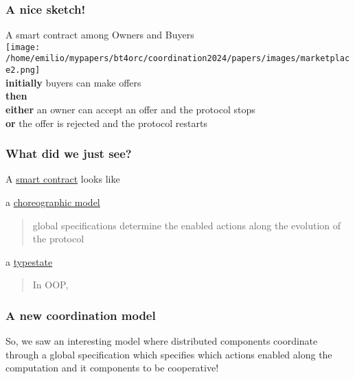 \begin{frame}
  \frametitle{A nice sketch! \cite{azure,azure/smp}}
  
  A smart contract among Owners and Buyers
  \\[1em]
  \texttt{[image: /home/emilio/mypapers/bt4orc/coordination2024/papers/images/marketplace2.png]}
  \\[1em]
  \textbf{initially} buyers can make offers
  \\\textbf{then}
  \\\phantom{xxx} \textbf{either} an owner can accept an offer and the protocol stops
  \\\phantom{xxx}	\textbf{or} the offer is rejected and the protocol restarts
\end{frame}

\begin{frame}
  \frametitle{What did we just see?}
  A \underline{smart contract} looks like

  \itemit a \underline{choreographic model}
  \begin{quote}
	 global specifications determine the
	 enabled actions along the evolution of the protocol
  \end{quote}
  \itemit a \underline{typestate}
  \begin{quote}
	 In OOP, ~\cite{gtwa14}
  \end{quote}
\end{frame}

\begin{frame}
  \frametitle{A new coordination model}
  So, we saw an interesting model where
  \itemit
  distributed components coordinate through a global specification
  \itemit which specifies which actions enabled along the computation
  \itemit and it  components to be cooperative!
  \itemit \
\end{frame}


